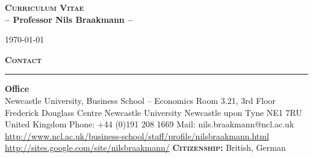 \documentclass[10pt,pdftex,a4paper,oneside]{article}
\begin{document}
\begin{center}
\begin{large}
\textbf{\textsc{Curriculum Vitae} \\ -- Professor Nils Braakmann --}\\
\end{large}
\today
\end{center}
\vspace{2ex}
\textbf{\textsc{Contact}}
\vspace{.5ex}
\hrule
\textbf{Office}\\
Newcastle University, Business School -- Economics \newline
Room 3.21, 3rd Floor\newline
Frederick Douglass Centre\newline
Newcastle University\newline
Newcastle upon Tyne\newline
NE1 7RU\newline
United Kingdom\newline
Phone: +44 (0)191 208 1669 \newline
Mail: nils.braakmann@ncl.ac.uk\newline
\url{http://www.ncl.ac.uk/business-school/staff/profile/nilsbraakmann.html}\newline
\url{http://sites.google.com/site/nilsbraakmann/}\newline
\textbf{\textsc{Citizenship:}} British, German \newline



\end{document}
